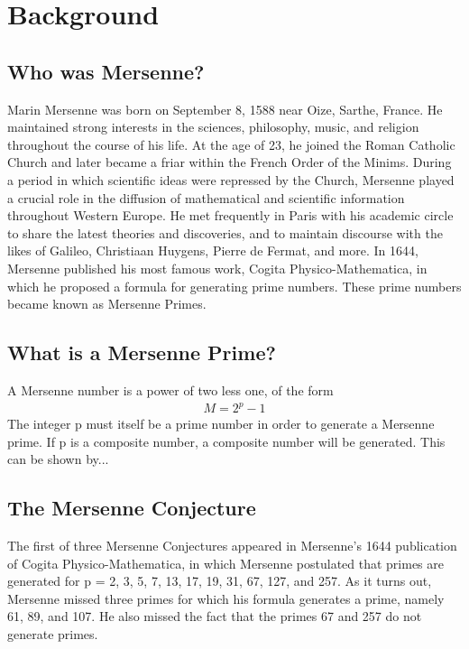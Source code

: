 \section{Background}

\subsection{Who was Mersenne?}
Marin Mersenne was born on September 8, 1588 near Oize, Sarthe, France. He maintained
strong interests in the sciences, philosophy, music, and religion throughout the course of his
life. At the age of 23, he joined the Roman Catholic Church and later became a friar within
the French Order of the Minims. During a period in which scientific ideas were repressed by
the Church, Mersenne played a crucial role in the diffusion of mathematical and scientific
information throughout Western Europe. He met frequently in Paris with his academic circle
to share the latest theories and discoveries, and to maintain discourse with the likes of Galileo,
Christiaan Huygens, Pierre de Fermat, and more. In 1644, Mersenne published his most famous
work, Cogita Physico-Mathematica, in which he proposed a formula for generating prime
numbers. These prime numbers became known as Mersenne Primes.

\subsection{What is a Mersenne Prime?}
A Mersenne number is a power of two less one, of the form
\begin{align}
M = 2^p - 1
\end{align}
The integer p must itself be a prime number in order to generate a Mersenne prime. If p is a
composite number, a composite number will be generated. This can be shown by...

\subsection{The Mersenne Conjecture}

The first of three Mersenne Conjectures appeared in Mersenne’s 1644 publication of Cogita
Physico-Mathematica, in which Mersenne postulated that primes are generated for p = 2, 3, 5,
7, 13, 17, 19, 31, 67, 127, and 257. As it turns out, Mersenne missed three primes for which his
formula generates a prime, namely 61, 89, and 107. He also missed the fact that the primes 67
and 257 do not generate primes.

